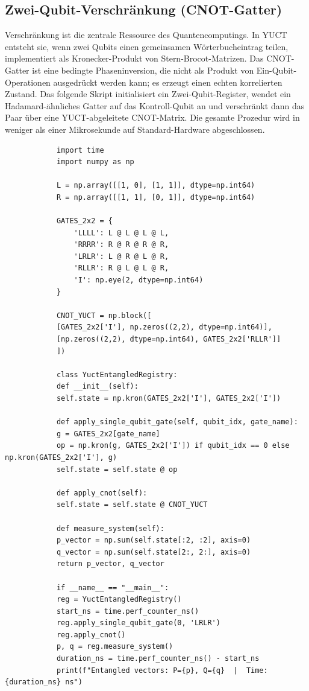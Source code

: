 \documentclass[11pt,a4paper]{article}
\begin{document}
	\subsection{Zwei-Qubit-Verschränkung (CNOT-Gatter)}
	
	Verschränkung ist die zentrale Ressource des Quantencomputings. In YUCT entsteht sie, wenn zwei Qubits einen gemeinsamen Wörterbucheintrag teilen, implementiert als Kronecker-Produkt von Stern-Brocot-Matrizen. Das CNOT-Gatter ist eine bedingte Phaseninversion, die nicht als Produkt von Ein-Qubit-Operationen ausgedrückt werden kann; es erzeugt einen echten korrelierten Zustand. Das folgende Skript initialisiert ein Zwei-Qubit-Register, wendet ein Hadamard-ähnliches Gatter auf das Kontroll-Qubit an und verschränkt dann das Paar über eine YUCT-abgeleitete CNOT-Matrix. Die gesamte Prozedur wird in weniger als einer Mikrosekunde auf Standard-Hardware abgeschlossen.
	
	\begin{tcolorbox}[title=YUCT-CNOT-Verschränkungsemulator (Python), breakable]
		\begin{lstlisting}
			import time
			import numpy as np
			
			L = np.array([[1, 0], [1, 1]], dtype=np.int64)
			R = np.array([[1, 1], [0, 1]], dtype=np.int64)
			
			GATES_2x2 = {
				'LLLL': L @ L @ L @ L,
				'RRRR': R @ R @ R @ R,
				'LRLR': L @ R @ L @ R,
				'RLLR': R @ L @ L @ R,
				'I': np.eye(2, dtype=np.int64)
			}
			
			CNOT_YUCT = np.block([
			[GATES_2x2['I'], np.zeros((2,2), dtype=np.int64)],
			[np.zeros((2,2), dtype=np.int64), GATES_2x2['RLLR']]
			])
			
			class YuctEntangledRegistry:
			def __init__(self):
			self.state = np.kron(GATES_2x2['I'], GATES_2x2['I'])
			
			def apply_single_qubit_gate(self, qubit_idx, gate_name):
			g = GATES_2x2[gate_name]
			op = np.kron(g, GATES_2x2['I']) if qubit_idx == 0 else np.kron(GATES_2x2['I'], g)
			self.state = self.state @ op
			
			def apply_cnot(self):
			self.state = self.state @ CNOT_YUCT
			
			def measure_system(self):
			p_vector = np.sum(self.state[:2, :2], axis=0)
			q_vector = np.sum(self.state[2:, 2:], axis=0)
			return p_vector, q_vector
			
			if __name__ == "__main__":
			reg = YuctEntangledRegistry()
			start_ns = time.perf_counter_ns()
			reg.apply_single_qubit_gate(0, 'LRLR')
			reg.apply_cnot()
			p, q = reg.measure_system()
			duration_ns = time.perf_counter_ns() - start_ns
			print(f"Entangled vectors: P={p}, Q={q}  |  Time: {duration_ns} ns")
		\end{lstlisting}
	\end{tcolorbox}
	
\end{document}
